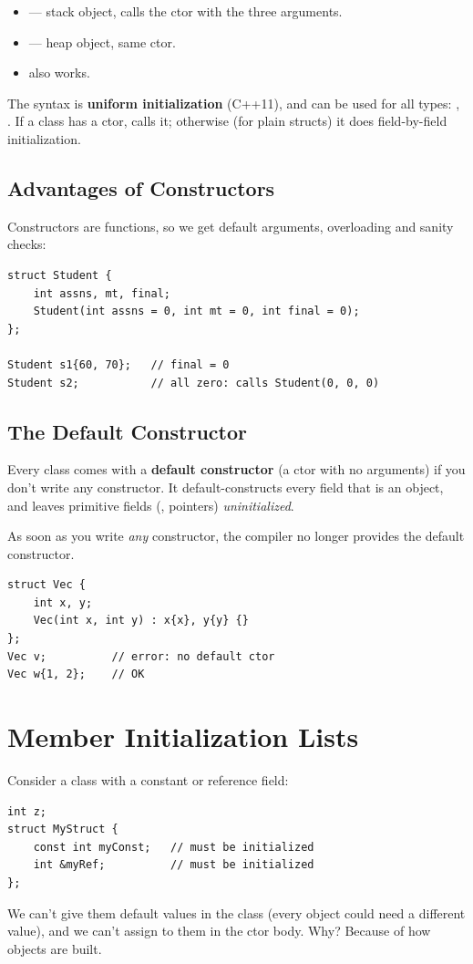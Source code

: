 \begin{itemize}
  \item {} --- stack object, calls the ctor
        with the three arguments.
  \item {} --- heap object, same
        ctor.
  \item {} also works.
\end{itemize}

The  syntax is \textbf{uniform initialization} (C++11), and can be
used for all types: , . If a class
has a ctor,  calls it; otherwise (for plain structs) it does
field-by-field initialization.

\subsection{Advantages of Constructors}
Constructors are functions, so we get default arguments, overloading and
sanity checks:
\begin{lstlisting}[style=cpp]
struct Student {
    int assns, mt, final;
    Student(int assns = 0, int mt = 0, int final = 0);
};

Student s1{60, 70};   // final = 0
Student s2;           // all zero: calls Student(0, 0, 0)
\end{lstlisting}

\subsection{The Default Constructor}
Every class comes with a \textbf{default constructor} (a ctor with no
arguments) if you don't write any constructor. It default-constructs every
field that is an object, and leaves primitive fields (, pointers)
\emph{uninitialized}.

\begin{important}
As soon as you write \emph{any} constructor, the compiler no longer provides the
default constructor.
\begin{lstlisting}[style=cpp]
struct Vec {
    int x, y;
    Vec(int x, int y) : x{x}, y{y} {}
};
Vec v;          // error: no default ctor
Vec w{1, 2};    // OK
\end{lstlisting}
\end{important}

\section{Member Initialization Lists}
Consider a class with a constant or reference field:
\begin{lstlisting}[style=cpp]
int z;
struct MyStruct {
    const int myConst;   // must be initialized
    int &myRef;          // must be initialized
};
\end{lstlisting}
We can't give them default values in the class (every object could need a
different value), and we can't assign to them in the ctor body. Why? Because of
how objects are built.

